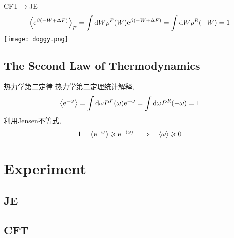     \begin{frame}{CFT$\to$JE}
        \begin{equation}
            \expval{\mathrm{e}^{\beta( - W + \Delta F)}}_F = \int\dd W\rho^F(W) \mathrm{e}^{\beta( - W + \Delta F)} = \int\dd W\rho^R(-W) = 1
        \end{equation}
        \pause
        \texttt{[image: doggy.png]}
    \end{frame}
    \subsection{The Second Law of Thermodynamics}
    \begin{frame}{热力学第二定律}
        热力学第二定理统计解释, 
        \begin{equation}
            \expval{\mathrm{e}^{-\omega}} = \int\dd \omega P^F(\omega) \mathrm{e}^{-\omega} = \int\dd \omega P^R(-\omega) = 1
        \end{equation}
        利用Jensen不等式,
        \begin{equation}
            1 = \expval{\mathrm{e}^{-\omega}} \geqslant \mathrm{e}^{-\expval{\omega}}\quad\Rightarrow\quad \expval{\omega} \geqslant 0
        \end{equation}
    \end{frame}


\section{Experiment}
    \subsection{JE}
    \subsection{CFT}
% 